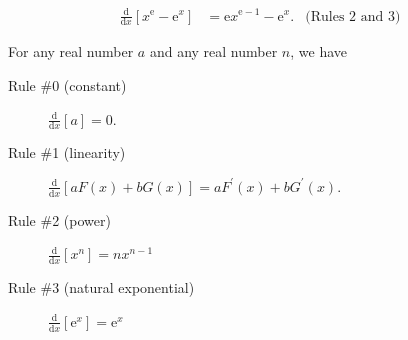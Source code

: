 \documentclass[12pt,fleqn,answers]{exam}
\begin{document}
\begin{questions}
\end{questions}
\begin{solution}
\begin{align*}
\frac{\mathrm{d}}{\mathrm{d} x} \left[ x^\mathrm{e} - \mathrm{e}^x  \right] &=
 \mathrm{e} x^{\mathrm{e} -1} - \mathrm{e}^x.  &\mbox{(Rules 2 and 3)}
\end{align*}
\end{solution}

\vfill

\noindent For any real number $a$ and any real number $n$, we have 
\begin{description}

\item[Rule \#0 (constant)] $ \displaystyle \frac{\mathrm{d}}{\mathrm{d} x} \left[a \right]  = 0 $.
 
\item[Rule \#1 (linearity)] $ \displaystyle \frac{\mathrm{d}}{\mathrm{d} x} \left[  a F(x) + b G(x)  \right] = a F^\prime(x) + b G^\prime(x) $.

\item [Rule \#2 (power)]  $   \displaystyle \frac{\mathrm{d}}{\mathrm{d} x} \left[ x^n \right]  = n x^{n-1}$

\item [Rule \#3 (natural exponential)]  $\displaystyle \frac{\mathrm{d}}{\mathrm{d} x} \left[ \mathrm{e}^x \right]  = 
\mathrm{e}^x $
\end{description}
\end{document}
